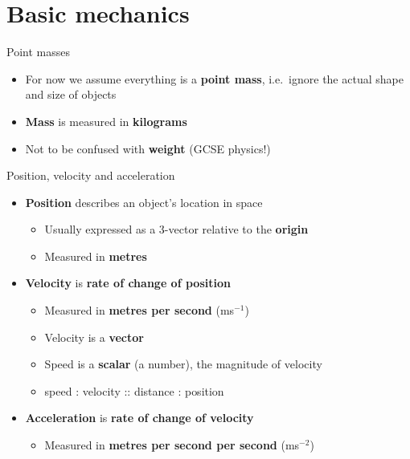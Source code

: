 \part{Basic mechanics}
\frame{\partpage}

\begin{frame}{Point masses}
	\begin{itemize}
		\pause\item For now we assume everything is a \textbf{point mass},
			i.e.\ ignore the actual shape and size of objects
		\pause\item \textbf{Mass} is measured in \textbf{kilograms}
		\pause\item Not to be confused with \textbf{weight} (GCSE physics!)
	\end{itemize}
\end{frame}

\begin{frame}{Position, velocity and acceleration}
	\begin{itemize}
		\pause\item \textbf{Position} describes an object's location in space
			\begin{itemize}
				\pause\item Usually expressed as a 3-vector relative to the \textbf{origin}
				\pause\item Measured in \textbf{metres}
			\end{itemize}
		\pause\item \textbf{Velocity} is \textbf{rate of change of position}
			\begin{itemize}
				\pause\item Measured in \textbf{metres per second} (ms$^{-1}$)
				\pause\item Velocity is a \textbf{vector}
				\pause\item Speed is a \textbf{scalar} (a number), the magnitude of velocity
				\pause\item speed : velocity :: distance : position
			\end{itemize}
		\pause\item \textbf{Acceleration} is \textbf{rate of change of velocity}
			\begin{itemize}
				\pause\item Measured in \textbf{metres per second per second} (ms$^{-2}$)
			\end{itemize}
	\end{itemize}
\end{frame}

